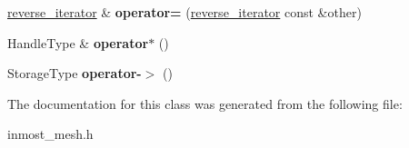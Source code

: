 \begin{DoxyCompactItemize}
\item 
\hypertarget{classINMOST_1_1ElementArray_1_1reverse__iterator_ae984218ea8ae50771cffd51b4100641d}{\hyperlink{classINMOST_1_1ElementArray_1_1reverse__iterator}{reverse\-\_\-iterator} \& {\bfseries operator=} (\hyperlink{classINMOST_1_1ElementArray_1_1reverse__iterator}{reverse\-\_\-iterator} const \&other)}\label{classINMOST_1_1ElementArray_1_1reverse__iterator_ae984218ea8ae50771cffd51b4100641d}

\item 
\hypertarget{classINMOST_1_1ElementArray_1_1reverse__iterator_a4aac2a4476ad6d4d07f6506ff765c899}{Handle\-Type \& {\bfseries operator$\ast$} ()}\label{classINMOST_1_1ElementArray_1_1reverse__iterator_a4aac2a4476ad6d4d07f6506ff765c899}

\item 
\hypertarget{classINMOST_1_1ElementArray_1_1reverse__iterator_aec20290a8c598c305deebc5c1c7652a4}{Storage\-Type {\bfseries operator-\/$>$} ()}\label{classINMOST_1_1ElementArray_1_1reverse__iterator_aec20290a8c598c305deebc5c1c7652a4}

\end{DoxyCompactItemize}


The documentation for this class was generated from the following file\-:\begin{DoxyCompactItemize}
\item 
inmost\-\_\-mesh.\-h\end{DoxyCompactItemize}
